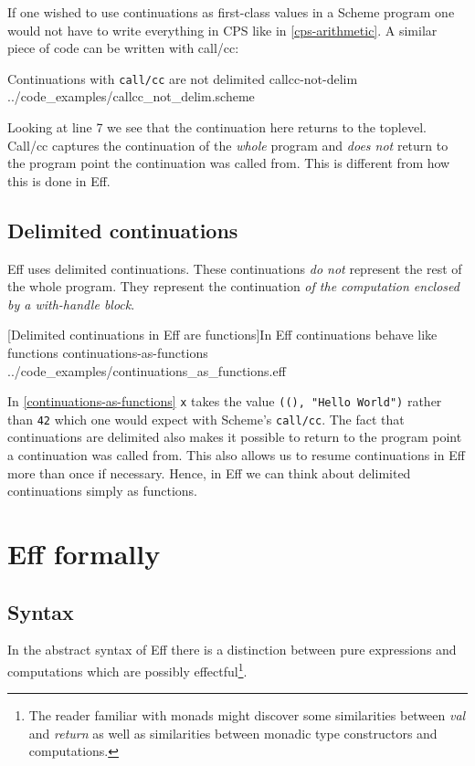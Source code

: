 \documentclass[class=article, crop=false]{standalone}
\begin{document}
If one wished to use continuations as first-class values in a Scheme program
one would not have to write everything in CPS like in \autoref{cps-arithmetic}. A similar piece of
code can be written with call/cc:

{Continuations with \lstinline{call/cc} are not delimited}
{callcc-not-delim}
{../code_examples/callcc_not_delim.scheme}

Looking at line 7 we see that the continuation here returns to the toplevel.
Call/cc captures the continuation of the \emph{whole} program and
\emph{does not} return to the program point the continuation was called from.
This is different from how this is done in Eff.

\subsection{Delimited continuations}

Eff uses delimited continuations. These continuations \emph{do not} represent
the rest of the whole program. They represent the continuation
\emph{of the computation enclosed by a with-handle block}.

{[Delimited continuations in Eff are functions]In Eff continuations behave like functions}
{continuations-as-functions}
{../code_examples/continuations_as_functions.eff}

In \autoref{continuations-as-functions} \lstinline{x} takes the value \lstinline{((), "Hello World")}
rather than \lstinline{42} which one would expect with Scheme's
\lstinline|call/cc|. The fact that continuations are delimited also makes it
possible to return to the program point a continuation was called from. This
also allows us to resume continuations in Eff more than once if necessary.
Hence, in Eff we can think about delimited continuations simply as functions.

\section{Eff formally}

\subsection{Syntax}

In the abstract syntax of Eff there is a distinction between pure expressions
and computations which are possibly effectful\footnote{The reader familiar with monads might discover some similarities
between \emph{val} and \emph{return} as well as similarities between monadic
type constructors and computations.}.
\end{document}
